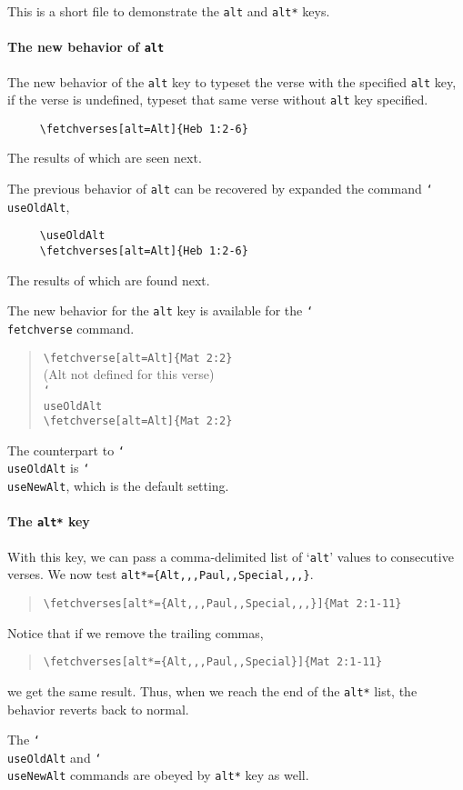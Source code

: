 \documentclass{article}
\providecommand\cs[1]{\texttt{\char`\\#1}}
\begin{document}
\noindent
This is a short file to demonstrate the \texttt{alt} and \texttt{alt*} keys.

\paragraph{The new behavior of \texttt{alt}} The new behavior of the \texttt{alt} key
to typeset the verse with the specified \texttt{alt} key, if the verse is
undefined, typeset that same verse without \texttt{alt} key specified.
\begin{verbatim}
     \fetchverses[alt=Alt]{Heb 1:2-6}
\end{verbatim}
The results of which are seen next.
\begin{quote}
\end{quote}
The previous behavior of \texttt{alt} can be recovered by expanded the command
\cs{useOldAlt},
\begin{verbatim}
     \useOldAlt
     \fetchverses[alt=Alt]{Heb 1:2-6}
\end{verbatim}
The results of which are found next.
\begin{quote}
\useOldAlt
{}
\end{quote}
The new behavior for the \texttt{alt} key is available for the \cs{fetchverse} command.
\begin{quote}
\verb!\fetchverse[alt=Alt]{Mat 2:2}!\\[3pt]
 (Alt not defined for this verse)\\[6pt]
\cs{useOldAlt}\\
\verb!\fetchverse[alt=Alt]{Mat 2:2}!\\[3pt]
\useOldAlt
{}
\end{quote}
The counterpart to \cs{useOldAlt} is \cs{useNewAlt}, which is the default setting.

\paragraph*{The \texttt{alt*} key} With this key, we can pass a comma-delimited list
of `\texttt{alt}' values to consecutive verses.
We now test \verb!alt*={Alt,,,Paul,,Special,,,}!.
\begin{quote}
\verb!\fetchverses[alt*={Alt,,,Paul,,Special,,,}]{Mat 2:1-11}!\\[3pt]
\end{quote}
Notice that if we remove the trailing commas,
\begin{quote}
\verb!\fetchverses[alt*={Alt,,,Paul,,Special}]{Mat 2:1-11}!\\[3pt]
\end{quote}
we get the same result. Thus, when we reach the end of the \texttt{alt*}
list, the behavior reverts back to normal.

The \cs{useOldAlt} and \cs{useNewAlt} commands are obeyed by \texttt{alt*} key as well.
\end{document}
